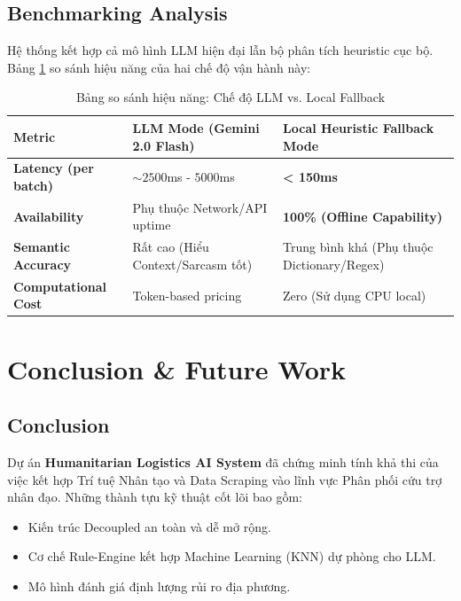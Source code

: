 \documentclass[12pt,a4paper]{article}
\begin{document}
\begin{itemize}
\subsection{Benchmarking Analysis}
Hệ thống kết hợp cả mô hình LLM hiện đại lẫn bộ phân tích heuristic cục bộ. Bảng \ref{tab:evaluation} so sánh hiệu năng của hai chế độ vận hành này:

\begin{table}[h!]
\centering
\caption{Bảng so sánh hiệu năng: Chế độ LLM vs. Local Fallback}
\label{tab:evaluation}
\vspace{0.2cm}
\begin{tabular}{@{} p{4.5cm} p{5.5cm} p{5.5cm} @{}}
\toprule
\textbf{Metric} & \textbf{LLM Mode (Gemini 2.0 Flash)} & \textbf{Local Heuristic Fallback Mode} \\
\midrule
\textbf{Latency (per batch)} & $\sim 2500$ms - $5000$ms & \textbf{< 150ms} \\
\textbf{Availability} & Phụ thuộc Network/API uptime & \textbf{100\% (Offline Capability)} \\
\textbf{Semantic Accuracy} & Rất cao (Hiểu Context/Sarcasm tốt) & Trung bình khá (Phụ thuộc Dictionary/Regex) \\
\textbf{Computational Cost} & Token-based pricing & Zero (Sử dụng CPU local) \\
\bottomrule
\end{tabular}
\end{table}

\newpage

\section{Conclusion \& Future Work}

\subsection{Conclusion}
Dự án \textbf{Humanitarian Logistics AI System} đã chứng minh tính khả thi của việc kết hợp Trí tuệ Nhân tạo và Data Scraping vào lĩnh vực Phân phối cứu trợ nhân đạo. Những thành tựu kỹ thuật cốt lõi bao gồm:
\begin{itemize}
    \item Kiến trúc Decoupled an toàn và dễ mở rộng.
    \item Cơ chế Rule-Engine kết hợp Machine Learning (KNN) dự phòng cho LLM.
    \item Mô hình đánh giá định lượng rủi ro địa phương.
\end{itemize}


\end{itemize}
\end{document}
